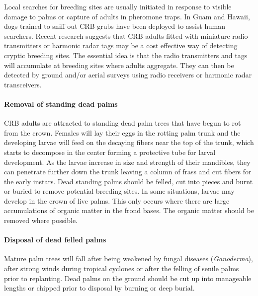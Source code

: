 \documentclass[twocolumn,letterpaper]{scrartcl}
\begin{document}
Local searches for breeding sites are usually initiated in response to visible damage to palms or capture of adults in pheromone traps. In Guam and Hawaii, dogs trained to sniff out CRB grubs have been deployed to assist human searchers. Recent research suggests that CRB adults fitted with miniature radio transmitters or harmonic radar tags may be a cost effective way of detecting cryptic breeding sites. The essential idea is that the radio transmitters and tags will accumulate at breeding sites where adults aggregate. They can then be detected by ground and/or aerial surveys using radio receivers or harmonic radar transceivers.



\paragraph{Removal of standing dead palms}
CRB adults are attracted to standing dead palm trees that have begun to rot from the crown. Females will lay their eggs in the rotting palm trunk and the developing larvae will feed on the decaying fibers near the top of the trunk, which starts to decompose in the center forming a protective tube for larval development. As the larvae increase in size and strength of their mandibles, they can penetrate further down the trunk leaving a column of frass and cut fibers for the early instars. Dead standing palms should be felled, cut into pieces and burnt or buried to remove potential breeding sites. In some situations, larvae may develop in the crown of live palms. This only occurs where there are large accumulations of organic matter in the frond bases. The organic matter should be removed where possible.

\paragraph{Disposal of dead felled palms}
Mature palm trees will fall after being weakened by fungal diseases (\textit{Ganoderma}), after strong winds during tropical cyclones or after the felling of senile palms prior to replanting. Dead palms on the ground should be cut up into manageable lengths or chipped prior to disposal by burning or deep burial. 
\end{document}
